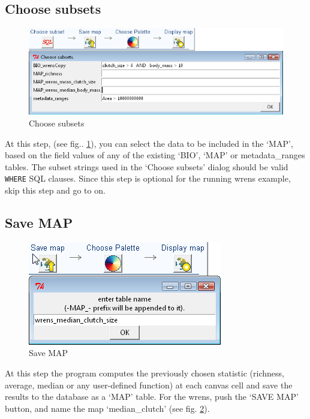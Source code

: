 \documentclass[ a4paper ]{article}
\begin{document}
	
	\subsection{Choose subsets}
	\begin{figure}[htbp]
	  \begin{center}
		\includegraphics[width=1\linewidth]{fig9}
		\caption{\label{fig:fig9} Choose subsets}
	  \end{center}
	\end{figure}
At this step, (see fig.. \ref{fig:fig9}), you can select the data to be included in the `MAP', based on the field values of any of the existing `BIO', `MAP' or metadata\_ranges tables. The subset strings used in the `Choose subsets' dialog should be valid \texttt{WHERE} SQL clauses. Since this step is optional for the running wrens example, skip this step and go to on.
	
	\subsection{Save MAP}
	\begin{figure}[htbp]
	  \begin{center}
		\includegraphics[width=0.5\linewidth]{fig10}
		\caption{\label{fig:fig10} Save MAP}
	  \end{center}
	\end{figure}

	At this step the program computes the previously chosen statistic (richness, average, median or any user-defined function) at each canvas cell and save the results to the database as a `MAP' table. For the wrens, push the `SAVE MAP' button, and name the map `median\_clutch' (see fig. \ref{fig:fig10}).
	
\end{document}
